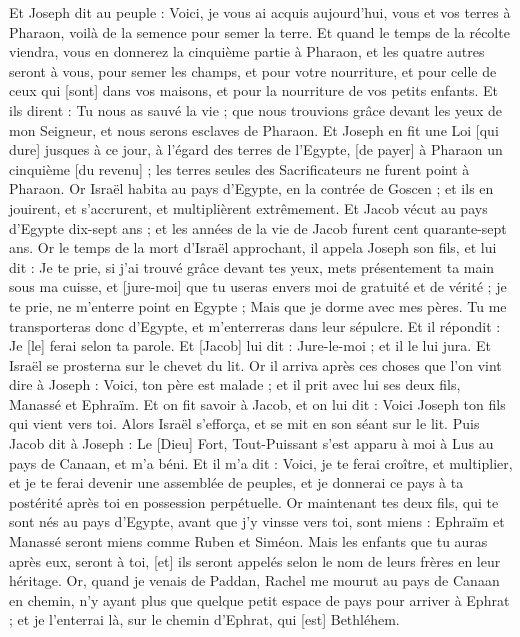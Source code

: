 \begin{multicols}{2}
Et Joseph dit au peuple : Voici, je vous ai acquis aujourd'hui, vous et vos terres à Pharaon, voilà de la semence pour semer la terre.
Et quand le temps de la récolte viendra, vous en donnerez la cinquième partie à Pharaon, et les quatre autres seront à vous, pour semer les champs, et pour votre nourriture, et pour celle de ceux qui [sont] dans vos maisons, et pour la nourriture de vos petits enfants.
Et ils dirent : Tu nous as sauvé la vie ; que nous trouvions grâce devant les yeux de mon Seigneur, et nous serons esclaves de Pharaon.
Et Joseph en fit une Loi [qui dure] jusques à ce jour, à l'égard des terres de l'Egypte, [de payer] à Pharaon un cinquième [du revenu] ; les terres seules des Sacrificateurs ne furent point à Pharaon.
Or Israël habita au pays d'Egypte, en la contrée de Goscen ; et ils en jouirent, et s'accrurent, et multiplièrent extrêmement.
Et Jacob vécut au pays d'Egypte dix-sept ans ; et les années de la vie de Jacob furent cent quarante-sept ans.
Or le temps de la mort d'Israël approchant, il appela Joseph son fils, et lui dit : Je te prie, si j'ai trouvé grâce devant tes yeux, mets présentement ta main sous ma cuisse, et [jure-moi] que tu useras envers moi de gratuité et de vérité ; je te prie, ne m'enterre point en Egypte ;
Mais que je dorme avec mes pères. Tu me transporteras donc d'Egypte, et m'enterreras dans leur sépulcre. Et il répondit : Je [le] ferai selon ta parole.
Et [Jacob] lui dit : Jure-le-moi ; et il le lui jura. Et Israël se prosterna sur le chevet du lit.
\VerseOne{}Or il arriva après ces choses que l'on vint dire à Joseph : Voici, ton père est malade ; et il prit avec lui ses deux fils, Manassé et Ephraïm.
Et on fit savoir à Jacob, et on lui dit : Voici Joseph ton fils qui vient vers toi. Alors Israël s'efforça, et se mit en son séant sur le lit.
Puis Jacob dit à Joseph : Le [Dieu] Fort, Tout-Puissant s'est apparu à moi à Lus au pays de Canaan, et m'a béni.
Et il m'a dit : Voici, je te ferai croître, et multiplier, et je te ferai devenir une assemblée de peuples, et je donnerai ce pays à ta postérité après toi en possession perpétuelle.
Or maintenant tes deux fils, qui te sont nés au pays d'Egypte, avant que j'y vinsse vers toi, sont miens : Ephraïm et Manassé seront miens comme Ruben et Siméon.
Mais les enfants que tu auras après eux, seront à toi, [et] ils seront appelés selon le nom de leurs frères en leur héritage.
Or, quand je venais de Paddan, Rachel me mourut au pays de Canaan en chemin, n'y ayant plus que quelque petit espace de pays pour arriver à Ephrat ; et je l'enterrai là, sur le chemin d'Ephrat, qui [est] Bethléhem.

\end{multicols}
